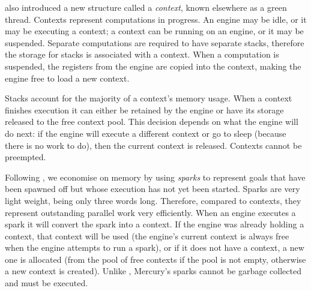 \citet{conway:2002:par} also introduced a new structure called a
\emph{context}, known elsewhere as a green thread.
Contexts represent computations in progress.
An engine may be idle, or it may be executing a context;
a context can be running on an engine, or it may be suspended.
Separate computations are required to have separate stacks,
therefore the storage for stacks is associated with a context.
When a computation is suspended,
the registers from the engine are copied into the context,
making the engine free to load a new context.

Stacks account for the majority of a context's memory usage.
When a context finishes execution
it can either be retained by the engine or
have its storage released to the free context pool.
This decision depends on what the engine will do next:
if the engine will execute a different context or go to sleep
(because there is no work to do),
then the current context is released.
Contexts cannot be preempted.

Following \citet{simonmar_2009_multicore_rts},
we economise on memory by using \emph{sparks}
to represent goals that have been spawned off
but whose execution has not yet been started.
Sparks are very light weight,
being only three words long.
Therefore, compared to contexts,
they represent outstanding parallel work very efficiently.
When an engine executes a spark it will convert the spark into a context.
If the engine was already holding a context,
that context will be used
(the engine's current context is always free when the engine attempts to run
a spark),
or if it does not have a context,
a new one is allocated
(from the pool of free contexts if the pool is not empty,
otherwise a new context is created).
Unlike \citet{simonmar_2009_multicore_rts},
Mercury's sparks cannot be garbage collected and must be executed.


